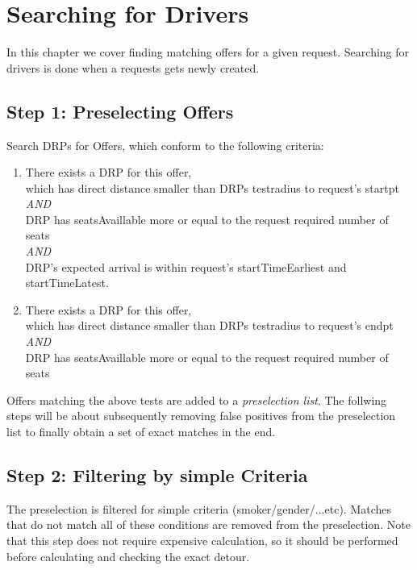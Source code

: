 \chapter{Searching for Drivers}
\label{searchForDrivers}

In this chapter we cover finding matching offers for a given request.
Searching for drivers is done when a requests gets newly created.

\section{Step 1: Preselecting Offers}
Search DRPs for Offers, which conform to the following criteria:
\begin{enumerate}
\item{There exists a DRP for this offer,\\
       which has direct distance smaller than DRPs testradius to request's startpt \\
	\emph{AND} \\
	DRP has seatsAvaillable more or equal to the request required number of seats\\
	\emph{AND} \\
	DRP's expected arrival is within request's startTimeEarliest and startTimeLatest.
      }
\item{There exists a DRP for this offer, \\ 
       which has direct distance smaller than DRPs testradius to request's endpt\\
	\emph{AND} \\
	DRP has seatsAvaillable more or equal to the request required number of seats
	}
\end{enumerate}
Offers matching the above tests are added to a  \emph{preselection list}.
The follwing steps will be about subsequently removing false positives from the preselection list 
to finally obtain a set of exact matches in the end. 

\section{Step 2: Filtering by simple Criteria}
\label{sfdFilteringSimpleCriteria}
The preselection is filtered for simple criteria (smoker/gender/...etc).
Matches that do not match all of these conditions are removed from the preselection.
Note that this step does not require expensive calculation, so it should be performed before
calculating and checking the exact detour.

